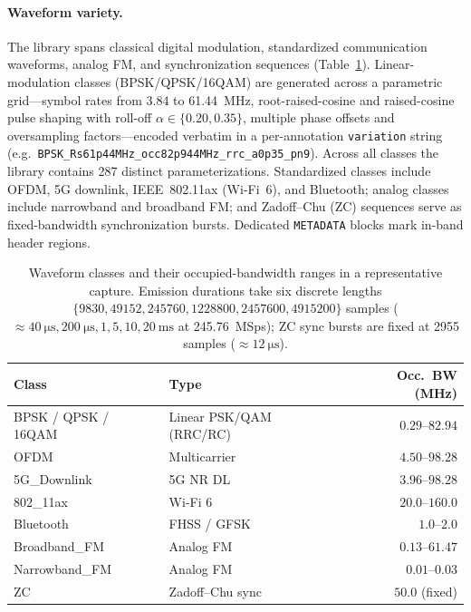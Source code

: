 \paragraph{Waveform variety.}
The library spans classical digital modulation, standardized communication
waveforms, analog FM, and synchronization sequences
(Table~\ref{tab:waveforms}). Linear-modulation classes (BPSK/QPSK/16QAM) are
generated across a parametric grid---symbol rates from \SI{3.84}{} to
\SI{61.44}{\mega\hertz}, root-raised-cosine and raised-cosine pulse shaping with
roll-off $\alpha\!\in\!\{0.20,0.35\}$, multiple phase offsets and oversampling
factors---encoded verbatim in a per-annotation \texttt{variation} string
(e.g.\ \texttt{BPSK\_Rs61p44MHz\_occ82p944MHz\_rrc\_a0p35\_pn9}). Across all
classes the library contains \num{287} distinct parameterizations. Standardized
classes include OFDM, 5G downlink, IEEE~802.11ax (Wi-Fi~6), and Bluetooth; analog
classes include narrowband and broadband FM; and Zadoff--Chu (ZC) sequences serve
as fixed-bandwidth synchronization bursts. Dedicated \texttt{METADATA} blocks mark
in-band header regions.

\begin{table}[t]
\centering
\caption{Waveform classes and their occupied-bandwidth ranges in a representative
capture. Emission durations take six discrete lengths
$\{9830,49152,245760,1228800,2457600,4915200\}$ samples
($\approx\SI{40}{\micro\second},\SI{200}{\micro\second},1,5,10,\SI{20}{\milli\second}$
at \SI{245.76}{MSps}); ZC sync bursts are fixed at \num{2955} samples
($\approx\SI{12}{\micro\second}$).}
\label{tab:waveforms}
\small
\begin{tabular}{@{}llr@{}}
\toprule
Class & Type & Occ.\ BW (MHz) \\
\midrule
BPSK / QPSK / 16QAM & Linear PSK/QAM (RRC/RC) & $0.29$--$82.94$ \\
OFDM               & Multicarrier            & $4.50$--$98.28$ \\
5G\_Downlink       & 5G NR DL                & $3.96$--$98.28$ \\
802\_11ax          & Wi-Fi 6                 & $20.0$--$160.0$ \\
Bluetooth          & FHSS / GFSK             & $1.0$--$2.0$ \\
Broadband\_FM      & Analog FM               & $0.13$--$61.47$ \\
Narrowband\_FM     & Analog FM               & $0.01$--$0.03$ \\
ZC                 & Zadoff--Chu sync        & $50.0$ (fixed) \\
\bottomrule
\end{tabular}
\end{table}

